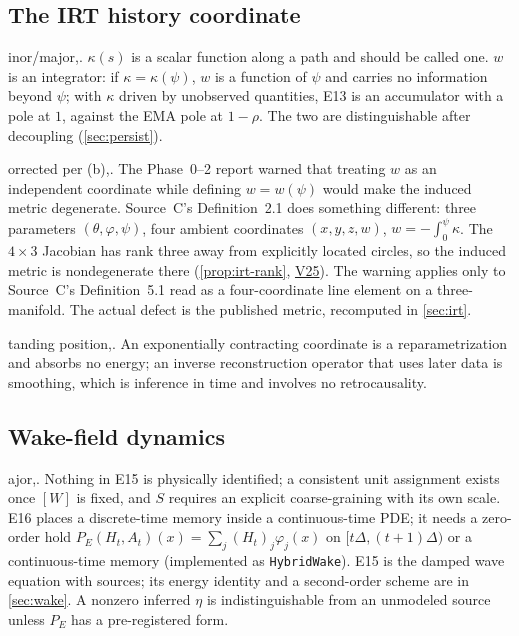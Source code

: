 \documentclass[11pt]{article}
\makeatletter
\theoremstyle{definition}
\theoremstyle{remark}
\newcommand{\code}[1]{\texttt{#1}}
\newcommand{\V}[1]{\hyperref[app:verify]{\textsf{#1}}}
\def\finding@split#1,#2\@nil{\textbf{#1}\if\relax\detokenize{#2}\relax\else\ (\ignorespaces\finding@strip#2\@nil)\fi}
\def\finding@strip#1,\@nil{#1}
\newenvironment{finding}[1][]{\par\smallskip\noindent\finding@split#1,\@nil.\enspace\ignorespaces}{\par\smallskip}
\makeatother
\begin{document}
\subsection{The IRT history coordinate}
\begin{finding}[F22--F23, minor/major] $\kappa(s)$ is a scalar function along a path and should be called one. $w$ is an integrator: if $\kappa=\kappa(\psi)$, $w$ is a function of $\psi$ and carries no information beyond $\psi$; with $\kappa$ driven by unobserved quantities, E13 is an accumulator with a pole at $1$, against the EMA pole at $1-\rho$. The two are distinguishable after decoupling (\cref{sec:persist}).
\end{finding}

\begin{finding}[F24, corrected per (b)] The Phase~0--2 report warned that treating $w$ as an independent coordinate while defining $w=w(\psi)$ would make the induced metric degenerate. Source~C's Definition~2.1 does something different: three parameters $(\theta,\varphi,\psi)$, four ambient coordinates $(x,y,z,w)$, $w=-\int_0^\psi\kappa$. The $4\times3$ Jacobian has rank three away from explicitly located circles, so the induced metric is nondegenerate there (\cref{prop:irt-rank}, \V{V25}). The warning applies only to Source~C's Definition~5.1 read as a four-coordinate line element on a three-manifold. The actual defect is the published metric, recomputed in \cref{sec:irt}.
\end{finding}

\begin{finding}[F25, standing position] An exponentially contracting coordinate is a reparametrization and absorbs no energy; an inverse reconstruction operator that uses later data is smoothing, which is inference in time and involves no retrocausality.
\end{finding}

\subsection{Wake-field dynamics}
\begin{finding}[F26--F29, major] Nothing in E15 is physically identified; a consistent unit assignment exists once $[W]$ is fixed, and $S$ requires an explicit coarse-graining with its own scale. E16 places a discrete-time memory inside a continuous-time PDE; it needs a zero-order hold $P_E(H_t,A_t)(x)=\sum_j(H_t)_j\varphi_j(x)$ on $[t\Delta,(t+1)\Delta)$ or a continuous-time memory (implemented as \code{HybridWake}). E15 is the damped wave equation with sources; its energy identity and a second-order scheme are in \cref{sec:wake}. A nonzero inferred $\eta$ is indistinguishable from an unmodeled source unless $P_E$ has a pre-registered form.
\end{finding}
\end{document}
